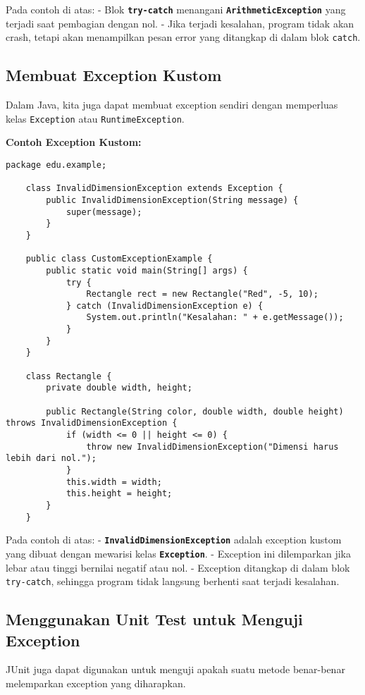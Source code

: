 Pada contoh di atas:
- Blok \textbf{\texttt{try-catch}} menangani \textbf{\texttt{ArithmeticException}} yang terjadi saat pembagian dengan nol.
- Jika terjadi kesalahan, program tidak akan crash, tetapi akan menampilkan pesan error yang ditangkap di dalam blok \texttt{catch}.

\subsection{Membuat Exception Kustom}

Dalam Java, kita juga dapat membuat exception sendiri dengan memperluas kelas \texttt{Exception} atau \texttt{RuntimeException}.

\textbf{Contoh Exception Kustom:}

\begin{lstlisting}[style=JavaStyle]
	package edu.example;
	
	class InvalidDimensionException extends Exception {
		public InvalidDimensionException(String message) {
			super(message);
		}
	}
	
	public class CustomExceptionExample {
		public static void main(String[] args) {
			try {
				Rectangle rect = new Rectangle("Red", -5, 10);
			} catch (InvalidDimensionException e) {
				System.out.println("Kesalahan: " + e.getMessage());
			}
		}
	}
	
	class Rectangle {
		private double width, height;
		
		public Rectangle(String color, double width, double height) throws InvalidDimensionException {
			if (width <= 0 || height <= 0) {
				throw new InvalidDimensionException("Dimensi harus lebih dari nol.");
			}
			this.width = width;
			this.height = height;
		}
	}
\end{lstlisting}

Pada contoh di atas:
- \textbf{\texttt{InvalidDimensionException}} adalah exception kustom yang dibuat dengan mewarisi kelas \textbf{\texttt{Exception}}.
- Exception ini dilemparkan jika lebar atau tinggi bernilai negatif atau nol.
- Exception ditangkap di dalam blok \texttt{try-catch}, sehingga program tidak langsung berhenti saat terjadi kesalahan.

\subsection{Menggunakan Unit Test untuk Menguji Exception}

JUnit juga dapat digunakan untuk menguji apakah suatu metode benar-benar melemparkan exception yang diharapkan.

